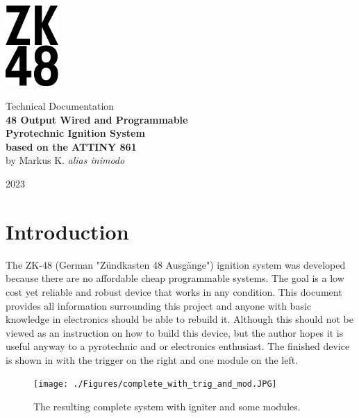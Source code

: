 


\begin{titlepage}
\begin{center}
\vspace*{1cm}
\includegraphics[width=2cm]{./Figures/zk_48_logo.png}
\vspace*{1cm}

\Huge {Technical Documentation\\} 
\vspace*{1cm}
\Huge{\textbf{48 Output Wired and Programmable\\ Pyrotechnic Ignition System\\ based on the ATTINY 861\\}}
\vspace*{0.5cm} 
\Large{by Markus K. \textit{alias inimodo}}
\vspace*{0.5cm}

\Large{2023}
\end{center}
\end{titlepage}

\pagebreak 

\tableofcontents

\pagebreak

\section{Introduction}
The ZK-48 (German "Zündkasten 48 Ausgänge") ignition system was developed because there are no affordable cheap programmable systems. The goal is a low cost yet reliable and robust device that works in any condition. This document provides all information surrounding this project and anyone with basic knowledge in electronics should be able to rebuild it. Although this should not be viewed as an instruction on how to build this device, but the author hopes it is useful anyway to a pyrotechnic and or electronics enthusiast. The finished device is shown in  with the trigger on the right and one module on the left.

\begin{figure}[!ht]
    \centering
    \texttt{[image: ./Figures/complete\_with\_trig\_and\_mod.JPG]}
    \caption{The resulting complete system with igniter and some modules.}
    \label{fig:complete_with_trig_and_mod}     
\end{figure}

